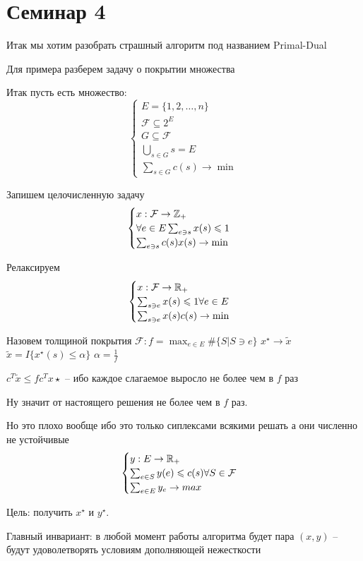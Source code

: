 \section*{Семинар 4}
Итак мы хотим разобрать страшный алгоритм под названием Primal-Dual

Для примера разберем задачу о покрытии множества

Итак пусть есть множество: 
\[
	\begin{cases}
		E = \{1, 2, \ldots, n\}\\
		\mathcal{F} \subseteq 2^E\\
		G \subseteq \mathcal{F}\\
		\bigcup_{s \in G} s = E\\
		\sum_{s \in G} c(s) \to \min
	\end{cases}
\]

Запишем целочисленную задачу
\[
	\begin{cases}
		x: \mathcal{F} \to \mathbb{Z}_+\\
		\forall e \in E \sum_{e \ni s} x(s) \leqslant 1\\
		\sum_{e \ni s} c(s) x(s) \to \min
	\end{cases}
\]

Релаксируем
\[
	\begin{cases}
		x: \mathcal{F} \to \mathbb{R}_+\\
		\sum_{s \ni e} x(s) \leqslant 1 \forall e \in E\\
		\sum_{s \ni e} x(s) c(s) \to \min
	\end{cases}
\]

 Назовем толщиной покрытия $\mathcal{F}: f = \max_{e \in E} \#\{S | S \ni e\}$
 $x^\star \to \tilde{x}$
 $\tilde{x} = I\{x^\star (s) \leq \alpha\}$
 $\alpha = \frac1f$

 $c^T \tilde x \leq f c^T x \star$ -- ибо каждое слагаемое выросло не более чем в $f$ раз

 Ну значит от настоящего решения не более чем в $f$ раз.

 Но это плохо вообще ибо это только сиплексами всякими решать а они численно не устойчивые
 \[
 	\begin{cases}
 		y: E \to \mathbb{R}_+\\
 		\sum_{e \in S} y(e) \leqslant c(s)  \forall S \in \mathcal{F}\\
 		\sum_{e \in E} y_e \to max
 	\end{cases}
 \]

Цель: получить $x^\star$ и $y^\star$.

Главный инвариант: в любой момент работы алгоритма будет пара $(x, y)$ -- будут удоволетворять условиям дополняющей нежесткости


